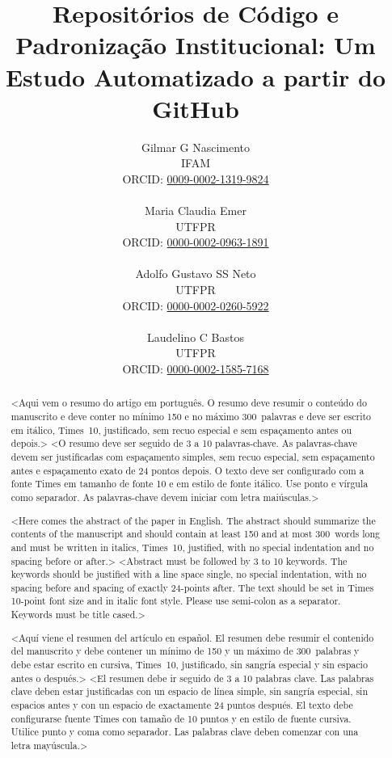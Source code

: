 \documentclass[english, spanish, brazilian]{RBIEarticle}
\title{Repositórios de Código e Padronização Institucional: Um Estudo Automatizado a partir do GitHub}
\author{%
	\parbox{4cm}{%
		Gilmar G Nascimento\\
		IFAM\\
		ORCID: \href{https://orcid.org/0009-0002-1319-9824}{0009-0002-1319-9824}\\
	}
	\parbox{4cm}{%
		Maria Claudia Emer\\
		UTFPR\\
		ORCID: \href{https://orcid.org/0000-0002-0963-1891}{0000-0002-0963-1891}\\
	}
	\parbox{4cm}{%
		Adolfo Gustavo SS Neto\\
		UTFPR\\
		ORCID: \href{https://orcid.org/0000-0002-0260-5922}{0000-0002-0260-5922}\\
	}
	\parbox{4cm}{%
		Laudelino C Bastos\\
		UTFPR\\
		ORCID: \href{https://orcid.org/0000-0002-1585-7168}{0000-0002-1585-7168}\\
	}
}
\begin{document}
	
	\maketitle
	
\begin{otherlanguage}{brazilian}
\begin{abstract}
<Aqui vem o resumo do artigo em português. O resumo deve resumir o conteúdo do manuscrito e deve conter no mínimo 150 e no máximo 300~palavras e deve ser escrito em itálico, Times~10, justificado, sem recuo especial e sem espaçamento antes ou depois.>
\keywords <O resumo deve ser seguido de 3 a 10 palavras-chave. As palavras-chave devem ser justificadas com espaçamento simples, sem recuo especial, sem espaçamento antes e espaçamento exato de 24 pontos depois. O texto deve ser configurado com a fonte Times em tamanho de fonte 10 e em estilo de fonte itálico. Use ponto e vírgula como separador. As palavras-chave devem iniciar com letra maiúsculas.>
\end{abstract}
\end{otherlanguage}

\begin{otherlanguage}{english}
\begin{abstract}
<Here comes the abstract of the paper in English. The abstract should summarize the contents of the manuscript and should contain at least 150 and at most 300~words long and must be written in italics, Times~10, justified, with no special indentation and no spacing before or after.>
\keywords <Abstract must be followed by 3 to 10 keywords. The keywords should be justified with a line space single, no special indentation, with no spacing before and spacing of exactly 24-points after. The text should be set in Times 10-point font size and in italic font style. Please use semi-colon as a separator. Keywords must be title cased.>
\end{abstract}
\end{otherlanguage}

\begin{otherlanguage}{spanish}
\begin{abstract}
<Aquí viene el resumen del artículo en español. El resumen debe resumir el contenido del manuscrito y debe contener un mínimo de 150 y un máximo de 300~palabras y debe estar escrito en cursiva, Times~10, justificado, sin sangría especial y sin espacio antes o después.>
\keywords <El resumen debe ir seguido de 3 a 10 palabras clave. Las palabras clave deben estar justificadas con un espacio de línea simple, sin sangría especial, sin espacios antes y con un espacio de exactamente 24 puntos después. El texto debe configurarse fuente Times con tamaño de 10 puntos y en estilo de fuente cursiva. Utilice punto y coma como separador. Las palabras clave deben comenzar con una letra mayúscula.>
\end{abstract}
\end{otherlanguage}
\end{document}
